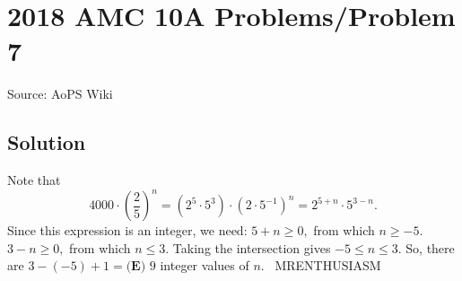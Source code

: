 \documentclass[12pt]{article}
\begin{document}
\section*{{2018 AMC 10A Problems/Problem 7}}
Source: AoPS Wiki

\subsection*{Solution}
Note that \[4000\cdot \left(\frac{2}{5}\right)^n=\left(2^5\cdot5^3\right)\cdot \left(2\cdot5^{-1}\right)^n=2^{5+n}\cdot5^{3-n}.\] Since this expression is an integer, we need: $5+n\geq0,$ from which $n\geq-5.$ $3-n\geq0,$ from which $n\leq3.$ Taking the intersection gives $-5\leq n\leq3.$ So, there are $3-(-5)+1=\boxed{\textbf{(E) }9}$ integer values of $n.$ ~MRENTHUSIASM
\end{document}
